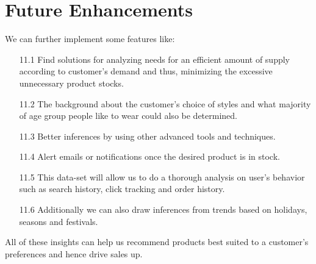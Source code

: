 \documentclass[11pt,journal,compsoc]{IEEEtran}
\begin{document}
\section{Future Enhancements}
We can further implement some features like:
\begin{itemize}
    \item[11.1] Find solutions for analyzing needs for an efficient amount of supply according to customer’s demand and thus, minimizing the excessive unnecessary product stocks. 
    \item[11.2] The background about the customer’s choice of styles and what majority of age group people like to wear could also be determined.
    \item[11.3] Better inferences by using other advanced tools and techniques.
    \item[11.4] Alert emails or notifications once the desired product is in stock. 
    \item[11.5] This data-set will allow us to do a thorough analysis on user's behavior such as search history, click tracking and order history.
    \item[11.6] Additionally we can also draw inferences from trends based on holidays, seasons and festivals.
\end{itemize}
All of these insights can help us recommend products best suited to a customer's preferences and hence drive sales up.
\end{document}
